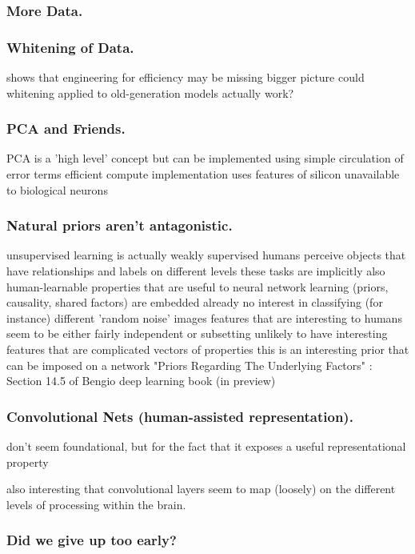 \documentclass[citeauthoryear]{llncs}
\begin{document}
\subsubsection*{More Data.}

\subsubsection*{Whitening of Data.}
    shows that engineering for efficiency may be missing bigger picture
    could whitening applied to old-generation models actually work?


\subsubsection*{PCA and Friends.}
PCA is a 'high level' concept
  but can be implemented using simple circulation of error terms
  efficient compute implementation uses features of silicon unavailable to biological neurons

\subsubsection*{Natural priors aren't antagonistic.}
unsupervised learning is actually weakly supervised 
  humans perceive objects that have relationships and labels on different levels
    these tasks are implicitly also human-learnable
    properties that are useful to neural network learning (priors, causality, shared factors) are embedded already
  no interest in classifying (for instance) different 'random noise' images
  features that are interesting to humans seem to be either fairly independent or subsetting
    unlikely to have interesting features that are complicated vectors of properties
    this is an interesting prior that can be imposed on a network
      "Priors Regarding The Underlying Factors" : Section 14.5 of Bengio deep learning book (in preview) 
        \cite{Bengio-et-al-2014-Book} 

\subsubsection*{Convolutional Nets (human-assisted representation).}
don't seem foundational, but for the fact that it exposes a useful representational property

also interesting that convolutional layers seem to map (loosely) on the 
different levels of processing within the brain.

\subsubsection*{Did we give up too early?}
 
\end{document}

